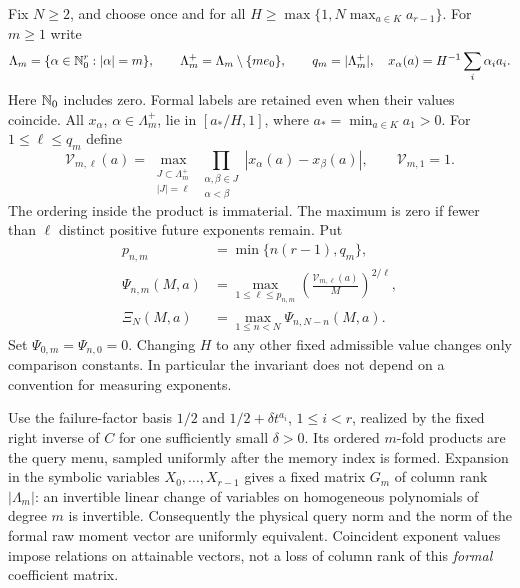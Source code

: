 \documentclass[11pt]{amsart}
\theoremstyle{definition}\newtheorem{definition}[theorem]{Definition}
\theoremstyle{remark}\newtheorem{remark}[theorem]{Remark}
\begin{document}
Fix $N\ge2$, and choose once and for all
$H\ge\max\{1,N\max_{a\in K}a_{r-1}\}$. For $m\ge1$ write
\[
 \Lambda_m=\{\alpha\in\mathbb N_0^r:|\alpha|=m\},\qquad
 \Lambda_m^+=\Lambda_m\setminus\{me_0\},\qquad
 q_m=|\Lambda_m^+|,
 \quad x_\alpha(a)=H^{-1}\sum_i\alpha_i a_i.
\]
Here $\mathbb N_0$ includes zero. Formal labels are retained even when their
values coincide. All $x_\alpha$, $\alpha\in\Lambda_m^+$, lie in
$[a_*/H,1]$, where $a_* =\min_{a\in K}a_1>0$.
For $1\le\ell\le q_m$ define
\begin{equation}\label{eq:determinant-volume}
 \mathcal V_{m,\ell}(a)=
 \max_{\substack{J\subset\Lambda_m^+\\|J|=\ell}}
    \prod_{\substack{\alpha,\beta\in J\\\alpha<\beta}}
          |x_\alpha(a)-x_\beta(a)|,
 \qquad \mathcal V_{m,1}=1.
\end{equation}
The ordering inside the product is immaterial. The maximum is zero if
fewer than $\ell$ distinct positive future exponents remain. Put
\begin{equation}\label{eq:intrinsic-profile}
 \begin{split}
 p_{n,m}&=\min\{n(r-1),q_m\},\\
 \Psi_{n,m}(M,a)&=
   \max_{1\le\ell\le p_{n,m}}
        \left(\frac{\mathcal V_{m,\ell}(a)}{M}\right)^{2/\ell},\\
 \Xi_N(M,a)&=\max_{1\le n<N}\Psi_{n,N-n}(M,a).
 \end{split}
\end{equation}
Set $\Psi_{0,m}=\Psi_{n,0}=0$. Changing $H$ to any other fixed
admissible value changes only comparison constants. In particular the
invariant does not depend on a convention for measuring exponents.

Use the failure-factor basis $1/2$ and $1/2+\delta t^{a_i}$,
$1\le i<r$, realized by the fixed right inverse of $C$ for one
sufficiently small $\delta>0$. Its ordered $m$-fold products are the
query menu, sampled uniformly after the memory index is formed. Expansion
in the symbolic variables $X_0,\ldots,X_{r-1}$ gives a fixed matrix
$G_m$ of column rank $|\Lambda_m|$: an invertible linear change of
variables on homogeneous polynomials of degree $m$ is invertible.
Consequently the physical query norm and the norm of the formal raw
moment vector are uniformly equivalent. Coincident exponent values impose
relations on attainable vectors, not a loss of column rank of this
\emph{formal} coefficient matrix.
\end{document}
